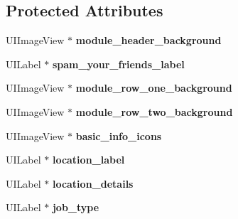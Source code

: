 \subsection*{\-Protected \-Attributes}
\begin{DoxyCompactItemize}
\item 
\hypertarget{interface_basic_info_module_a74c14ff9ebd23bda9d74c67a16d1ac32}{
\-U\-I\-Image\-View $\ast$ {\bfseries module\-\_\-header\-\_\-background}}
\label{interface_basic_info_module_a74c14ff9ebd23bda9d74c67a16d1ac32}

\item 
\hypertarget{interface_basic_info_module_ae2d410b2da972808c4195e02d955c58a}{
\-U\-I\-Label $\ast$ {\bfseries spam\-\_\-your\-\_\-friends\-\_\-label}}
\label{interface_basic_info_module_ae2d410b2da972808c4195e02d955c58a}

\item 
\hypertarget{interface_basic_info_module_a4db9ef90811ee4c2f23b06440249bbf7}{
\-U\-I\-Image\-View $\ast$ {\bfseries module\-\_\-row\-\_\-one\-\_\-background}}
\label{interface_basic_info_module_a4db9ef90811ee4c2f23b06440249bbf7}

\item 
\hypertarget{interface_basic_info_module_a24e817e95a9ee123a1622eab312f77ec}{
\-U\-I\-Image\-View $\ast$ {\bfseries module\-\_\-row\-\_\-two\-\_\-background}}
\label{interface_basic_info_module_a24e817e95a9ee123a1622eab312f77ec}

\item 
\hypertarget{interface_basic_info_module_ab7fb71d1b08eed0674a3ed73f9f40d6a}{
\-U\-I\-Image\-View $\ast$ {\bfseries basic\-\_\-info\-\_\-icons}}
\label{interface_basic_info_module_ab7fb71d1b08eed0674a3ed73f9f40d6a}

\item 
\hypertarget{interface_basic_info_module_aea776f686beb15d66707e7a5f270ff64}{
\-U\-I\-Label $\ast$ {\bfseries location\-\_\-label}}
\label{interface_basic_info_module_aea776f686beb15d66707e7a5f270ff64}

\item 
\hypertarget{interface_basic_info_module_a5366134b787b900f12e98f38732278d8}{
\-U\-I\-Label $\ast$ {\bfseries location\-\_\-details}}
\label{interface_basic_info_module_a5366134b787b900f12e98f38732278d8}

\item 
\hypertarget{interface_basic_info_module_a5aebe76bbb7704ccf057323c52f1b388}{
\-U\-I\-Label $\ast$ {\bfseries job\-\_\-type}}
\label{interface_basic_info_module_a5aebe76bbb7704ccf057323c52f1b388}


\end{DoxyCompactItemize}
